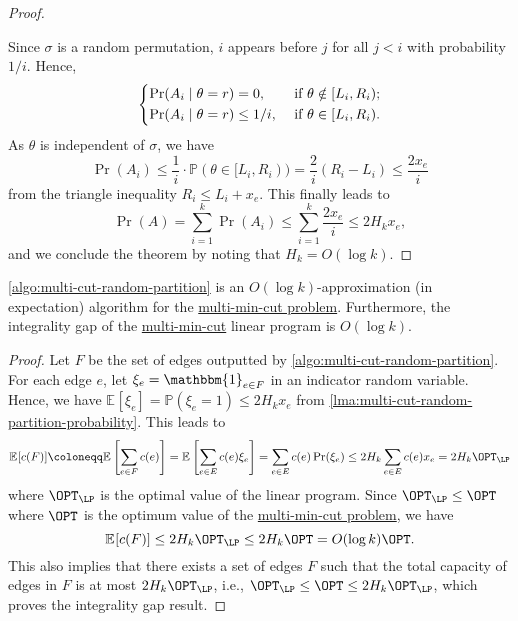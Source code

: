 \begin{proof}
	\begin{center}
	\end{center}

	Since \(\sigma \) is a random permutation, \(i\) appears before \(j\) for all \(j < i\) with probability \(1 / i\). Hence,
	\[
		\begin{dcases}
			\Pr(A_i \mid \theta = r) = 0,        & \text{ if } \theta \notin [L_i, R_i) ; \\
			\Pr(A_i \mid \theta = r) \leq 1 / i, & \text{ if } \theta \in [L_i, R_i).
		\end{dcases}
	\]
	As \(\theta \) is independent of \(\sigma \), we have
	\[
		\Pr(A_i)
		\leq \frac{1}{i} \cdot \mathbb{P} (\theta \in [L_i, R_i))
		= \frac{2}{i} (R_i - L_i)
		\leq \frac{2x_e}{i}
	\]
	from the triangle inequality \(R_i \leq L_i + x_e\). This finally leads to
	\[
		\Pr(A)
		= \sum_{i=1}^{k} \Pr(A_i) \leq \sum_{i=1}^{k} \frac{2x_e}{i}
		\leq 2 H_k x_e,
	\]
	and we conclude the theorem by noting that \(H_k = O(\log k)\).
\end{proof}

\begin{theorem}\label{thm:multi-min-cut-integrality-gap}
	\autoref{algo:multi-cut-random-partition} is an \(O(\log k)\)-approximation (in expectation) algorithm for the \hyperref[prb:multi-min-cut]{multi-min-cut problem}. Furthermore, the integrality gap of the \hyperref[prb:multi-min-cut]{multi-min-cut} linear program is \(O(\log k)\).
\end{theorem}
\begin{proof}
	Let \(F\) be the set of edges outputted by \autoref{algo:multi-cut-random-partition}. For each edge \(e\), let \(\xi _e = \mathbbm{1}_{e \in F}\) in an indicator random variable. Hence, we have \(\mathbb{E}_{}[\xi _e] = \mathbb{P} (\xi _e = 1) \leq 2 H_k x_e\) from \autoref{lma:multi-cut-random-partition-probability}. This leads to
	\[
		\mathbb{E}_{}[c(F)]
		\coloneqq \mathbb{E}_{}\left[ \sum_{e \in F} c(e) \right]
		= \mathbb{E}_{}\left[\sum_{e \in E} c(e) \xi _e\right]
		= \sum_{e \in E} c(e) \Pr(\xi _e)
		\leq 2 H_k \sum_{e \in E} c(e) x_e
		= 2 H_k \OPT_{\LP}
	\]
	where \(\OPT_{\LP}\) is the optimal value of the linear program. Since \(\OPT_{\LP} \leq \OPT\) where \(\OPT\) is the optimum value of the \hyperref[prb:multi-min-cut]{multi-min-cut problem}, we have
	\[
		\mathbb{E}_{}[c(F)]
		\leq 2 H_k \OPT_{\LP}
		\leq 2 H_k \OPT
		= O(\log k) \OPT.
	\]
	This also implies that there exists a set of edges \(F\) such that the total capacity of edges in \(F\) is at most \(2 H_k \OPT_{\LP} \), i.e., \(\OPT_{\LP} \leq \OPT \leq 2 H_k \OPT_{\LP}\), which proves the integrality gap result.
\end{proof}

